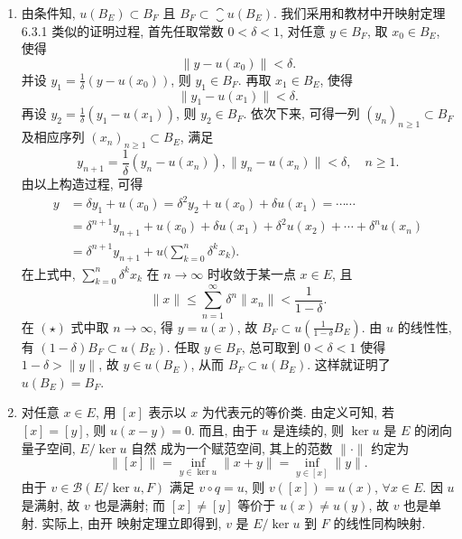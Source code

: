\begin{enumerate}
\begin{answer}
\begin{enumerate}
        \item 由条件知, $u(B_{E})\subset B_{F}$ 且 $B_{F}\subset\closure{u\left(B_{E}\right)}$. 
        我们采用和教材中开映射定理 6.3.1 类似的证明过程, 首先任取常数 $0<\delta<1$, 对任意 $y\in B_{F}$, 取 $x_0\in B_{E}$, 使得
        \[
        \|y-u(x_0)\|<\delta.
        \] 
        并设 $y_{1}=\frac{1}{\delta}(y-u(x_{0}))$, 则 $y_1\in B_F$. 再取 $x_1\in B_E$, 使得
        \[
        \|y_{1}-u(x_{1})\|<\delta .
        \]
        再设 $y_2=\frac{1}{\delta}(y_1-u(x_1))$, 则 $y_2\in B_F$. 依次下来, 
        可得一列 $(y_n)_{n\geq 1}\subset B_F$ 及相应序列 $(x_n)_{n\geq 1}\subset B_E$, 满足
        \[
        y_{n+1}=\frac{1}{\delta}(y_n-u(x_n)),\|y_{n}-u(x_{n})\|<\delta, \quad n\geq 1.
        \]
        由以上构造过程, 可得
        \begin{equation}
            \begin{aligned}
                y &=\delta y_{1}+u(x_{0})=\delta^{2} y_{2}+u(x_{0})+\delta u(x_{1})=\cdots \cdots \\
                &=\delta^{n+1} y_{n+1}+u(x_{0})+\delta u(x_{1})+\delta^{2} u(x_{2})+\cdots+\delta^{n} u(x_{n}) \\
                &=\delta^{n+1} y_{n+1}+u\biggl(\sum_{k=0}^{n} \delta^{k} x_{k}\biggr).
            \end{aligned}\tag{$\star$}
        \end{equation}
        在上式中, $\sum_{k=0}^n \delta^k x_k$ 在 $n\to\infty$ 时收敛于某一点 $x\in E$, 且
        \[\|x\|\leq\sum_{n=1}^{\infty}\delta^n\|x_n\|<\frac{1}{1-\delta}.\]
        在 $(\star)$ 式中取 $n\to\infty$, 得 $y=u(x)$, 故 $B_F\subset u(\frac{1}{1-\delta}B_E)$.
        由 $u$ 的线性性, 有 $(1-\delta)B_F\subset u(B_E)$.
        任取 $y\in B_F$, 总可取到 $0<\delta<1$ 使得 $1-\delta>\|y\|$, 故
        $y\in u(B_E)$, 从而 $B_F\subset u(B_E)$. 这样就证明了 $u(B_E)=B_F$.
    
        \item 对任意 $x\in E$, 用 $[x]$ 表示以 $x$ 为代表元的等价类. 由定义可知, 若 $[x]=[y]$, 则
        $u(x-y)=0$. 而且, 由于 $u$ 是连续的, 则 $\ker u$ 是 $E$ 的闭向量子空间, $E/\ker u$ 自然
        成为一个赋范空间, 其上的范数 $\|\cdot\|$ 约定为
        \[\|[x]\|=\inf_{y\in\ker u}\|x+y\|=\inf_{y\in[x]}\|y\|.\]
        由于 $v\in\mathcal{B}(E/\ker u, F)$ 满足 $v\circ q=u$, 则 $v([x])=u(x)$, $\forall x\in E$. 
        因 $u$ 是满射, 故 $v$ 也是满射; 而 $[x]\neq[y]$ 等价于 $u(x)\neq u(y)$, 故 $v$ 也是单射. 实际上, 由开
        映射定理立即得到, $v$ 是 $E/\ker u$ 到 $F$ 的线性同构映射.
    

\end{enumerate}
\end{answer}
\end{enumerate}
